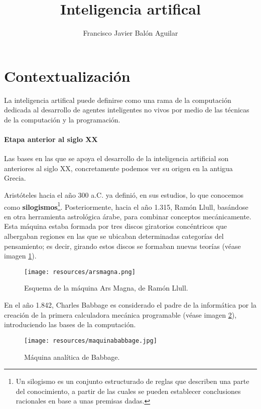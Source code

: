 \documentclass[a4paper, 11pt, titlepage]{article}
\title{Inteligencia artifical}
\author{Francisco Javier Balón Aguilar}
\begin{document}
\maketitle
\renewcommand{\contentsname}{Índice}
\tableofcontents
\newpage 

\section{Contextualización}

    La inteligencia artifical puede definirse como una rama de la computación dedicada al
    desarrollo de agentes inteligentes no vivos por medio de las técnicas de la computación 
    y la programación.

    \paragraph{Etapa anterior al siglo XX} Las bases en las que se apoya el desarrollo de la inteligencia 
    artificial son anteriores al siglo XX, concretamente podemos ver su origen en la antigua Grecia.

    Aristóteles hacia el año 300 a.C. ya definió, en sus estudios, lo que conocemos como 
    \textbf{silogismos}\footnote{
        Un silogismo es un conjunto estructurado de reglas que describen una parte del conocimiento, 
        a partir de las cuales se pueden establecer conclusiones racionales en base a unas 
        premisas dadas.
    }. Posteriormente, hacia el año 1.315, Ramón Llull, basándose en otra herramienta astrológica 
    árabe, para combinar conceptos mecánicamente. Esta máquina estaba formada por tres discos 
    giratorios concéntricos que albergaban regiones en las que se ubicaban determinadas categorías 
    del pensamiento; es decir, girando estos discos se formaban nuevas teorías (véase imagen 
    \ref{arsmagna}).

    \begin{figure}[htp]
        \centering
        \texttt{[image: resources/arsmagna.png]}
        \caption{Esquema de la máquina Ars Magna, de Ramón Llull.}
        \label{arsmagna}
    \end{figure}

    En el año 1.842, Charles Babbage es considerado el padre de la informática por la creación de la 
    primera calculadora mecánica programable (véase imagen \ref{maquinabaggage}), introduciendo las bases 
    de la computación.

    \begin{figure}[htp]
        \centering
        \texttt{[image: resources/maquinababbage.jpg]}
        \caption{Máquina analítica de Babbage.}
        \label{maquinabaggage}
    \end{figure}
\end{document}
